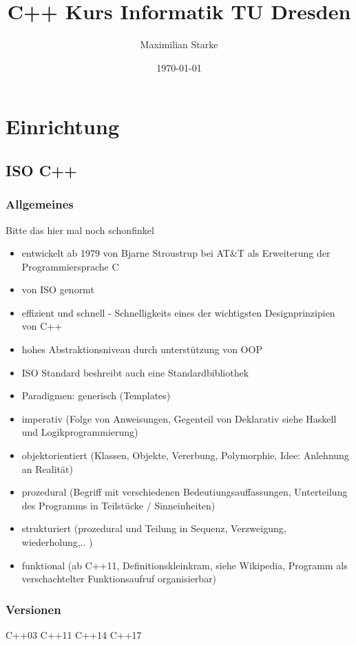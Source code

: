 \documentclass[a4paper]{report}
\title{C++ Kurs Informatik TU Dresden}
\author{Maximilian Starke}
\date{\today}
\theoremstyle{nonumberplain}
\begin{document}
\maketitle
\tableofcontents

\chapter{Einrichtung}

\section{ISO C++}

\subsection{Allgemeines}
Bitte das hier mal noch schonfinkel
\begin{itemize}
\item entwickelt ab 1979 von Bjarne Stroustrup bei AT\&T als Erweiterung der Programmiersprache C
\item von ISO genormt
\item effizient und schnell - Schnelligkeits eines der wichtigsten Designprinzipien von C++
\item hohes Abstraktionsniveau durch unterstützung von OOP
\item ISO Standard beshreibt auch eine Standardbibliothek

\item Paradigmen:
\subitem generisch (Templates)
\item imperativ (Folge von Anweisungen, Gegenteil von Deklarativ siehe Haskell und Logikprogrammierung)
\item objektorientiert (Klassen, Objekte, Vererbung, Polymorphie, Idee: Anlehnung an Realität)
\item prozedural (Begriff mit verschiedenen Bedeutiungsauffassungen, Unterteilung des Programms in Teilstücke / Sinneinheiten)
\item strukturiert (prozedural und Teilung in Sequenz, Verzweigung, wiederholung,.. )
\item funktional (ab C++11, Definitionskleinkram, siehe Wikipedia, Programm als verschachtelter Funktionsaufruf organisierbar)
\end{itemize}

\subsection{Versionen}
C++03
C++11
C++14
C++17
\end{document}

